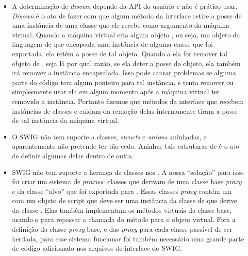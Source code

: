   \begin{itemize}
    \item A determinação de \textit{disown} depende da API do usuário e não é prático usar.
      \textit{Disown} é o ato de fazer com que algum método da interface \CXX{} retire a posse
      de uma instância de uma classe \CXX{} que ele recebe como argumento da máquina virtual. 
      Quando a máquina virtual cria algum objeto \CXX{}, ou seja, um objeto da linguagem de 
      \script{} que encapsula uma instância de alguma classe \CXX{} que foi exportada, ela
      retém a posse de tal objeto. Quando a ela for remover tal objeto de \script{}, seja 
      lá por qual razão, se ela deter a posse do objeto, ela também irá remover a instância 
      \CXX{} encapsulada. Isso pode causar problemas se alguma parte do código \CXX{} tem 
      algum ponteiro para tal instância, e tenta remover ou simplesmente usar ela em algum
      momento após a máquina virtual ter removido a instância. Portanto fizemos que métodos
      da interface \CXX{} que recebem instâncias de classes e cuidam da remoção delas 
      internamente tiram a posse de tal instância da máquina virtual.
    \item O SWIG não tem suporte a classes, \textit{structs} e \textit{unions} aninhadas, e 
      aparentemente não pretende ter tão cedo. Aninhar tais estruturas de \CXX{} é o ato
      de definir algumas delas dentro de outra.
    \item SWIG não tem suporte a herança de classes \CXX{} nos . A nossa ``solução''
      para isso foi criar um sistema de \textit{proxies}\footnotemark: classes \CXX{} que derivam de uma
      classe base \textit{proxy} e da classe ``alvo'' \CXX{} que foi exportada para \script{}.
      Essas classes \textit{proxy} contém um \VObj{} com um objeto de script que deve ser uma
      instância da classe de \script{} que derive da classe \CXX{}. Elas também implementam 
      os métodos virtuais da classe base, usando o \VObj{} para repassar a chamada do método
      para o objeto virtual. Fora a definição da classe \textit{proxy} base, e das \textit{proxy}
      para cada classe \CXX{} passível de ser herdada, para esse sistema funcionar foi também
      necessário uma grande parte de código adicionado nos arquivos de interface do SWIG.
      
      

\end{itemize}
